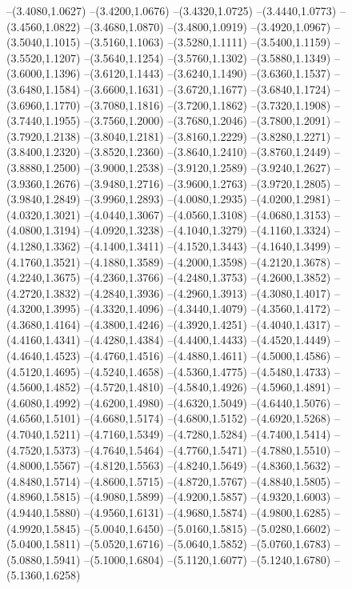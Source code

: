 {\begin{scope}
--(3.4080,1.0627)
--(3.4200,1.0676)
--(3.4320,1.0725)
--(3.4440,1.0773)
--(3.4560,1.0822)
--(3.4680,1.0870)
--(3.4800,1.0919)
--(3.4920,1.0967)
--(3.5040,1.1015)
--(3.5160,1.1063)
--(3.5280,1.1111)
--(3.5400,1.1159)
--(3.5520,1.1207)
--(3.5640,1.1254)
--(3.5760,1.1302)
--(3.5880,1.1349)
--(3.6000,1.1396)
--(3.6120,1.1443)
--(3.6240,1.1490)
--(3.6360,1.1537)
--(3.6480,1.1584)
--(3.6600,1.1631)
--(3.6720,1.1677)
--(3.6840,1.1724)
--(3.6960,1.1770)
--(3.7080,1.1816)
--(3.7200,1.1862)
--(3.7320,1.1908)
--(3.7440,1.1955)
--(3.7560,1.2000)
--(3.7680,1.2046)
--(3.7800,1.2091)
--(3.7920,1.2138)
--(3.8040,1.2181)
--(3.8160,1.2229)
--(3.8280,1.2271)
--(3.8400,1.2320)
--(3.8520,1.2360)
--(3.8640,1.2410)
--(3.8760,1.2449)
--(3.8880,1.2500)
--(3.9000,1.2538)
--(3.9120,1.2589)
--(3.9240,1.2627)
--(3.9360,1.2676)
--(3.9480,1.2716)
--(3.9600,1.2763)
--(3.9720,1.2805)
--(3.9840,1.2849)
--(3.9960,1.2893)
--(4.0080,1.2935)
--(4.0200,1.2981)
--(4.0320,1.3021)
--(4.0440,1.3067)
--(4.0560,1.3108)
--(4.0680,1.3153)
--(4.0800,1.3194)
--(4.0920,1.3238)
--(4.1040,1.3279)
--(4.1160,1.3324)
--(4.1280,1.3362)
--(4.1400,1.3411)
--(4.1520,1.3443)
--(4.1640,1.3499)
--(4.1760,1.3521)
--(4.1880,1.3589)
--(4.2000,1.3598)
--(4.2120,1.3678)
--(4.2240,1.3675)
--(4.2360,1.3766)
--(4.2480,1.3753)
--(4.2600,1.3852)
--(4.2720,1.3832)
--(4.2840,1.3936)
--(4.2960,1.3913)
--(4.3080,1.4017)
--(4.3200,1.3995)
--(4.3320,1.4096)
--(4.3440,1.4079)
--(4.3560,1.4172)
--(4.3680,1.4164)
--(4.3800,1.4246)
--(4.3920,1.4251)
--(4.4040,1.4317)
--(4.4160,1.4341)
--(4.4280,1.4384)
--(4.4400,1.4433)
--(4.4520,1.4449)
--(4.4640,1.4523)
--(4.4760,1.4516)
--(4.4880,1.4611)
--(4.5000,1.4586)
--(4.5120,1.4695)
--(4.5240,1.4658)
--(4.5360,1.4775)
--(4.5480,1.4733)
--(4.5600,1.4852)
--(4.5720,1.4810)
--(4.5840,1.4926)
--(4.5960,1.4891)
--(4.6080,1.4992)
--(4.6200,1.4980)
--(4.6320,1.5049)
--(4.6440,1.5076)
--(4.6560,1.5101)
--(4.6680,1.5174)
--(4.6800,1.5152)
--(4.6920,1.5268)
--(4.7040,1.5211)
--(4.7160,1.5349)
--(4.7280,1.5284)
--(4.7400,1.5414)
--(4.7520,1.5373)
--(4.7640,1.5464)
--(4.7760,1.5471)
--(4.7880,1.5510)
--(4.8000,1.5567)
--(4.8120,1.5563)
--(4.8240,1.5649)
--(4.8360,1.5632)
--(4.8480,1.5714)
--(4.8600,1.5715)
--(4.8720,1.5767)
--(4.8840,1.5805)
--(4.8960,1.5815)
--(4.9080,1.5899)
--(4.9200,1.5857)
--(4.9320,1.6003)
--(4.9440,1.5880)
--(4.9560,1.6131)
--(4.9680,1.5874)
--(4.9800,1.6285)
--(4.9920,1.5845)
--(5.0040,1.6450)
--(5.0160,1.5815)
--(5.0280,1.6602)
--(5.0400,1.5811)
--(5.0520,1.6716)
--(5.0640,1.5852)
--(5.0760,1.6783)
--(5.0880,1.5941)
--(5.1000,1.6804)
--(5.1120,1.6077)
--(5.1240,1.6780)
--(5.1360,1.6258)

\end{scope}}
